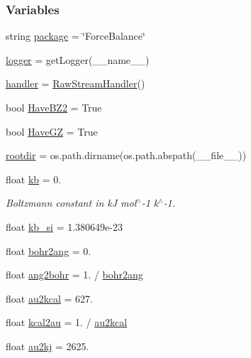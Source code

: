 \subsubsection*{Variables}
\begin{DoxyCompactItemize}
\item 
string \hyperlink{namespacesrc_1_1nifty_a4c9c65626bf4784905a24e3669495270}{package} = \char`\"{}Force\+Balance\char`\"{}
\item 
\hyperlink{namespacesrc_1_1nifty_a4e0494740e9bf31fcd1643da616936c9}{logger} = get\+Logger(\+\_\+\+\_\+name\+\_\+\+\_\+)
\item 
\hyperlink{namespacesrc_1_1nifty_a599f84c26888697b2045441d2c712c6e}{handler} = \hyperlink{classsrc_1_1nifty_1_1RawStreamHandler}{Raw\+Stream\+Handler}()
\item 
bool \hyperlink{namespacesrc_1_1nifty_ad6f6a6beeecef1286072c627406a3ff2}{Have\+B\+Z2} = True
\item 
bool \hyperlink{namespacesrc_1_1nifty_aaf88bcbdbd381d12c8b8f252de831aea}{Have\+GZ} = True
\item 
\hyperlink{namespacesrc_1_1nifty_a95a677429c7a93940e9d1ac85a8896a8}{rootdir} = os.\+path.\+dirname(os.\+path.\+abspath(\+\_\+\+\_\+file\+\_\+\+\_\+))
\item 
float \hyperlink{namespacesrc_1_1nifty_a089f6f141e72825090e5f20f8ad49281}{kb} = 0.
\begin{DoxyCompactList}\small\item\em Boltzmann constant in kJ mol$^\wedge$-\/1 k$^\wedge$-\/1. \end{DoxyCompactList}\item 
float \hyperlink{namespacesrc_1_1nifty_ad2e00824fb9acbea9ed5992470dd42d6}{kb\+\_\+si} = 1.\+380649e-\/23
\item 
float \hyperlink{namespacesrc_1_1nifty_a4ce0e3b582ee58a4286a88bd46202002}{bohr2ang} = 0.
\item 
float \hyperlink{namespacesrc_1_1nifty_ae6ed06f09cc69631ba6edbad578f1fb5}{ang2bohr} = 1. / \hyperlink{namespacesrc_1_1nifty_a4ce0e3b582ee58a4286a88bd46202002}{bohr2ang}
\item 
float \hyperlink{namespacesrc_1_1nifty_a37759136a820bf4cc8818b4a45865a8d}{au2kcal} = 627.
\item 
float \hyperlink{namespacesrc_1_1nifty_a39edc5592ca319974e55d5e8891a1e7b}{kcal2au} = 1. / \hyperlink{namespacesrc_1_1nifty_a37759136a820bf4cc8818b4a45865a8d}{au2kcal}
\item 
float \hyperlink{namespacesrc_1_1nifty_af5788f33a1e5a2d91f1dba0b7dc00f3e}{au2kj} = 2625.

\end{DoxyCompactItemize}
